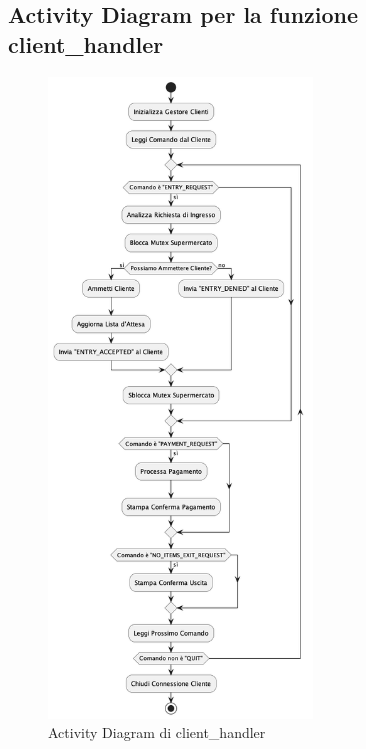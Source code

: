 \documentclass[a4paper, 12pt]{article}
\begin{document}
\subsection{Activity Diagram per la funzione client\_handler}
\begin{figure}[h!]
\centering
\includegraphics[width=70mm,scale=0.5]{Images/client_handler.png}
\caption{Activity Diagram di client\_handler}
\label{fig:activity-diagram}
\end{figure}
\end{document}
